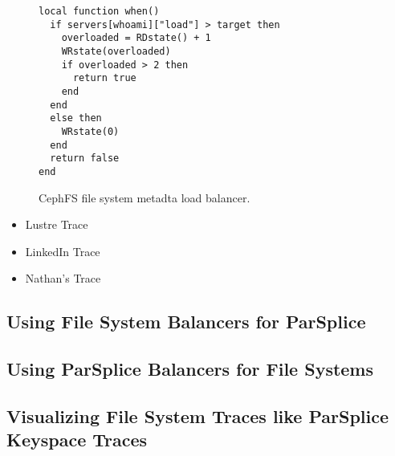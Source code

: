 \begin{figure}[tb]
\begin{verbatim}
local function when()
  if servers[whoami]["load"] > target then
    overloaded = RDstate() + 1
    WRstate(overloaded)
    if overloaded > 2 then
      return true
    end
  end
  else then
    WRstate(0)
  end
  return false
end
\end{verbatim}
\caption{CephFS file system metadta load balancer.\label{lua:cephfs}}
\end{figure}

\begin{itemize}
  \item Lustre Trace
  \item LinkedIn Trace
  \item Nathan's Trace
\end{itemize}

\subsection{Using File System Balancers for ParSplice}
\subsection{Using ParSplice Balancers for File Systems}
\subsection{Visualizing File System Traces like ParSplice Keyspace Traces}
